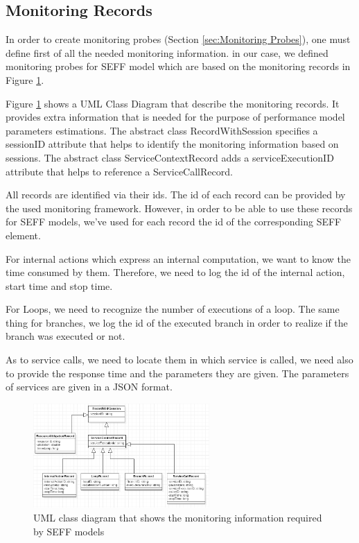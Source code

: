 \subsection{Monitoring Records}
\label{sec:Monitoring Records}
In order to create monitoring probes (Section \ref{sec:Monitoring Probes}), one must define first of all the needed monitoring information. in our case, we defined monitoring probes for SEFF model which are based on the monitoring records in Figure \ref{fig:records}. 

Figure \ref{fig:records} shows a UML Class Diagram that describe the monitoring records. It provides extra information that is needed for the purpose of performance model parameters estimations. The abstract class RecordWithSession specifies a sessionID attribute that helps to identify the monitoring information based on sessions.  The abstract class ServiceContextRecord adds a serviceExecutionID attribute that helps to reference a ServiceCallRecord.

All records are identified via their ids. The id of each record can be provided by the used monitoring framework. However, in order to be able to use these records for SEFF models, we've used for each record the id of the corresponding SEFF element. 

For internal actions which express an internal computation, we want to know the time consumed by them. Therefore, we need to log the id of the internal action, start time and stop time. 

For Loops, we need to recognize the number of executions of a loop. The same thing for branches, we log the id of the executed branch in order to realize if the branch was executed or not. 

As to service calls, we need to locate them in which service is called, we need also to provide the response time and the parameters they are given. The parameters of services are given in a JSON format.

\begin{figure}[h]
\centering
\includegraphics[width=0.6\textwidth]{figures/records}
\caption{UML class diagram that shows the monitoring information required by SEFF models}
\label{fig:records}
\end{figure}

